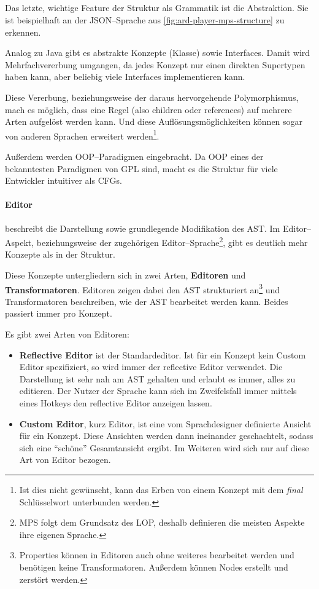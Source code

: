 \subparagraph*{}
Das letzte, wichtige Feature der Struktur als Grammatik ist die Abstraktion.
Sie ist beispielhaft an der \ac{JSON}--Sprache aus \autoref{fig:ard-player-mps-structure} zu erkennen.

Analog zu Java gibt es abstrakte Konzepte (Klasse) sowie Interfaces.
Damit wird Mehrfachvererbung umgangen, da jedes Konzept nur einen direkten Supertypen haben kann, aber beliebig viele Interfaces implementieren kann.

Diese Vererbung, beziehungsweise der daraus hervorgehende Polymorphismus, mach es möglich, dass eine Regel (also {\ttfamily children} oder {\ttfamily references}) auf mehrere Arten aufgelöst werden kann.
Und diese Auflösungsmöglichkeiten können sogar von anderen Sprachen erweitert werden\footnote{Ist dies nicht gewünscht, kann das Erben von einem Konzept mit dem \textit{final} Schlüsselwort unterbunden werden.}.

Außerdem werden \acs{OOP}--Paradigmen eingebracht.
Da \ac{OOP} eines der bekanntesten Paradigmen von \ac{GPL} sind, macht es die Struktur für viele Entwickler intuitiver als \acp{CFG}.

\paragraph{Editor} beschreibt die Darstellung sowie grundlegende Modifikation des \ac{AST}.
Im Editor--Aspekt, beziehungsweise der zugehörigen Editor--Sprache\footnote{\ac{MPS} folgt dem Grundsatz des \ac{LOP}, deshalb definieren die meisten Aspekte ihre eigenen Sprache.}, gibt es deutlich mehr Konzepte als in der Struktur.

Diese Konzepte untergliedern sich in zwei Arten, \textbf{Editoren} und \textbf{Transformatoren}.
Editoren zeigen dabei den \ac{AST} strukturiert an\footnote{Properties können in Editoren auch ohne weiteres bearbeitet werden und benötigen keine Transformatoren. Außerdem können Nodes erstellt und zerstört werden.} und Transformatoren beschreiben, wie der \ac{AST} bearbeitet werden kann.
Beides passiert immer pro Konzept.

Es gibt zwei Arten von Editoren:
\begin{itemize}
    \item \textbf{Reflective Editor} ist der Standardeditor.
    Ist für ein Konzept kein Custom Editor spezifiziert, so wird immer der reflective Editor verwendet.
    Die Darstellung ist sehr nah am \ac{AST} gehalten und erlaubt es immer, alles zu editieren.
    Der Nutzer der Sprache kann sich im Zweifelsfall immer mittels eines Hotkeys den reflective Editor anzeigen lassen.
    \item \textbf{Custom Editor}, kurz Editor, ist eine vom Sprachdesigner definierte Ansicht für ein Konzept.
    Diese Ansichten werden dann ineinander geschachtelt, sodass sich eine \enquote{schöne} Gesamtansicht ergibt.
    Im Weiteren wird sich nur auf diese Art von Editor bezogen.
\end{itemize}

